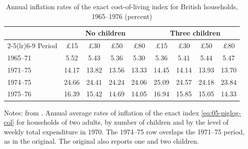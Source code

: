 \begin{table}[htbp]
\centering
\caption{Annual inflation rates of the exact cost-of-living index for British households, 1965--1976 (percent)}
\label{tab:05-dm-table71}
\small
\begin{tabular}{lcccccccc}
\toprule
 & \multicolumn{4}{c}{No children} & \multicolumn{4}{c}{Three children} \\
\cmidrule(lr){2-5}\cmidrule(lr){6-9}
Period & \pounds 15 & \pounds 30 & \pounds 50 & \pounds 80 & \pounds 15 & \pounds 30 & \pounds 50 & \pounds 80 \\
\midrule
1965--71 & 5.52 & 5.43 & 5.36 & 5.30 & 5.36 & 5.41 & 5.44 & 5.47 \\
1971--75 & 14.17 & 13.82 & 13.56 & 13.33 & 14.45 & 14.14 & 13.93 & 13.70 \\
1974--75 & 24.66 & 24.41 & 24.24 & 24.06 & 25.09 & 24.57 & 24.18 & 23.84 \\
1975--76 & 16.39 & 15.42 & 14.69 & 14.05 & 16.94 & 15.85 & 15.05 & 14.33 \\
\bottomrule
\end{tabular}

\smallskip
\begin{minipage}{0.94\textwidth}
\footnotesize Notes: from \citet[Table~7.1, p.~177]{DeatonMuellbauer1980b}. Annual average rates of
inflation of the exact index \eqref{eq:05-piglog-col} for households of two adults, by number of
children and by the level of weekly total expenditure in 1970. The 1974--75 row overlaps the 1971--75
period, as in the original. The original also reports one and two children.
\end{minipage}
\end{table}

